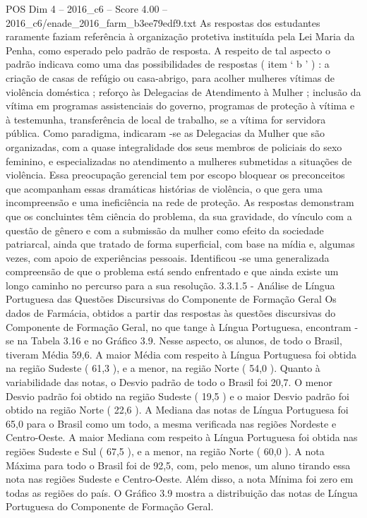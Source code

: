 \begin{textsample}{POS Dim 4 – 2016\_c6 – Score 4.00 – 2016\_c6/enade\_2016\_farm\_b3ee79edf9.txt}
As respostas dos estudantes raramente faziam referência à organização protetiva instituída pela Lei Maria da Penha, como esperado pelo padrão de resposta.
A respeito de tal aspecto o padrão indicava como uma das possibilidades de respostas ( item ‘ b ’ ) : a criação de casas de refúgio ou casa-abrigo, para acolher mulheres vítimas de violência doméstica ; reforço às Delegacias de Atendimento à Mulher ; inclusão da vítima em programas assistenciais do governo, programas de proteção à vítima e à testemunha, transferência de local de trabalho, se a vítima for servidora pública.
Como paradigma, indicaram -se as Delegacias da Mulher que são organizadas, com a quase integralidade dos seus membros de policiais do sexo feminino, e especializadas no atendimento a mulheres submetidas a situações de violência.
Essa preocupação gerencial tem por escopo bloquear os preconceitos que acompanham essas dramáticas histórias de violência, o que gera uma incompreensão e uma ineficiência na rede de proteção.
As respostas demonstram que os concluintes têm ciência do problema, da sua gravidade, do vínculo com a questão de gênero e com a submissão da mulher como efeito da sociedade patriarcal, ainda que tratado de forma superficial, com base na mídia e, algumas vezes, com apoio de experiências pessoais.
Identificou -se uma generalizada compreensão de que o problema está sendo enfrentado e que ainda existe um longo caminho no percurso para a sua resolução. 3.3.1.5 - Análise de Língua Portuguesa das Questões Discursivas do Componente de Formação Geral Os dados de Farmácia, obtidos a partir das respostas às questões discursivas do Componente de Formação Geral, no que tange à Língua Portuguesa, encontram -se na Tabela 3.16 e no Gráfico 3.9.
Nesse aspecto, os alunos, de todo o Brasil, tiveram Média 59,6.
A maior Média com respeito à Língua Portuguesa foi obtida na região Sudeste ( 61,3 ), e a menor, na região Norte ( 54,0 ).
Quanto à variabilidade das notas, o Desvio padrão de todo o Brasil foi 20,7.
O menor Desvio padrão foi obtido na região Sudeste ( 19,5 ) e o maior Desvio padrão foi obtido na região Norte ( 22,6 ).
A Mediana das notas de Língua Portuguesa foi 65,0 para o Brasil como um todo, a mesma verificada nas regiões Nordeste e Centro-Oeste.
A maior Mediana com respeito à Língua Portuguesa foi obtida nas regiões Sudeste e Sul ( 67,5 ), e a menor, na região Norte ( 60,0 ).
A nota Máxima para todo o Brasil foi de 92,5, com, pelo menos, um aluno tirando essa nota nas regiões Sudeste e Centro-Oeste.
Além disso, a nota Mínima foi zero em todas as regiões do país.
O Gráfico 3.9 mostra a distribuição das notas de Língua Portuguesa do Componente de Formação Geral.

\end{textsample}
